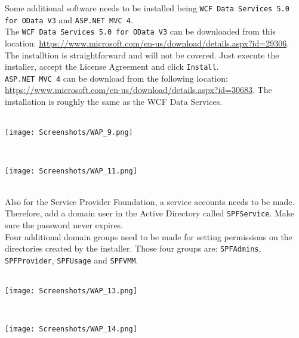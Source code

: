 \clearpage

Some additional software needs to be installed being \texttt{WCF Data Services 5.0 for OData V3} and \texttt{ASP.NET MVC 4}. \\
The \texttt{WCF Data Services 5.0 for OData V3} can be downloaded from this location: \url{https://www.microsoft.com/en-us/download/details.aspx?id=29306}. The installtion is straightforward and will not be covered. Just execute the installer, accept the License Agreement and  click \texttt{Install}.\\
\texttt{ASP.NET MVC 4} can be download from the following location: \url{https://www.microsoft.com/en-us/download/details.aspx?id=30683}. The installation is roughly the same as the WCF Data Services.
$\;$ \\ \\
\noindent\begin{minipage}{\textwidth}
    \centering
    \texttt{[image: Screenshots/WAP\_9.png]}
\end{minipage}
$\;$ \\ \\
\noindent\begin{minipage}{\textwidth}
    \centering
    \texttt{[image: Screenshots/WAP\_11.png]}
\end{minipage}
$\;$ \\ \\
Also for the Service Provider Foundation, a service accounts needs to be made. Therefore, add a domain user in the Active Directory called \texttt{SPFService}. Make sure the password never expires. \\
Four additional domain groups need to be made for setting permissions on the directories created by the installer. Those four groups are: \texttt{SPFAdmins}, \texttt{SPFProvider}, \texttt{SPFUsage} and \texttt{SPFVMM}.
$\;$ \\ \\
\noindent\begin{minipage}{\textwidth}
    \centering
    \texttt{[image: Screenshots/WAP\_13.png]}
\end{minipage}
$\;$ \\ \\
\noindent\begin{minipage}{\textwidth}
    \centering
    \texttt{[image: Screenshots/WAP\_14.png]}
\end{minipage}
